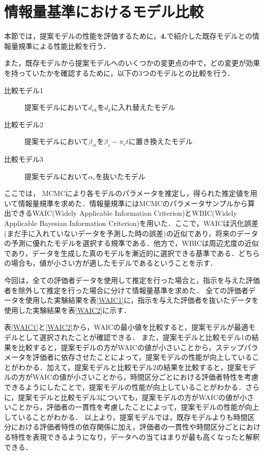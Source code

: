 \documentclass[a4paper,11pt,oneside,openany]{jsbook}
\begin{document}
\section{情報量基準におけるモデル比較}
本節では，提案モデルの性能を評価するために，\textbf{4.}で紹介した既存モデルとの情報量規準による性能比較を行う．

また，既存モデルから提案モデルへのいくつかの変更点の中で，どの変更が効果を持っていたかを確認するために，以下の3つのモデルとの比較を行う．

\begin{description}
\item [比較モデル1]提案モデルにおいて$d_{rk}$を$d_k$に入れ替えたモデル
\item [比較モデル2]提案モデルにおいて$\beta_{rt}$を$\beta_{r} - \pi_{r}t$に置き換えたモデル
\item [比較モデル3]提案モデルにおいて$\alpha_r$を抜いたモデル
\end{description}

ここでは， MCMCにより各モデルのパラメータを推定し，得られた推定値を用いて情報量規準を求めた．情報量規準にはMCMCのパラメータサンプルから算出できるWAIC(Widely Applicable Information Criterion)とWBIC(Widely Applicable Bayesian Information Criterion)を用いた．ここで，WAICは汎化誤差(まだ手に入れていないデータを予測した時の誤差)の近似であり，将来のデータの予測に優れたモデルを選択する規準である．他方で，WBICは周辺尤度の近似であり，データを生成した真のモデルを漸近的に選択できる基準である．どちらの場合も，値が小さい方が適したモデルであるということを示す．

今回は，全ての評価者データを使用して推定を行った場合と，指示を与えた評価者を除外して推定を行った場合に分けて情報量基準を求めた．
全ての評価者データを使用した実験結果を表\ref{WAIC1}に，指示を与えた評価者を抜いたデータを使用した実験結果を表\ref{WAIC2}に示す．

表\ref{WAIC1}と\ref{WAIC2}から，WAICの最小値を比較すると，提案モデルが最適モデルとして選択されたことが確認できる．
また，提案モデルと比較モデル1の結果を比較すると，提案モデルの方がWAICの値が小さいことから，ステップパラメータを評価者に依存させたことによって，提案モデルの性能が向上していることがわかる．加えて，提案モデルと比較モデル2の結果を比較すると，提案モデルの方がWAICの値が小さいことから，時間区分ごとにおける評価者特性を考慮できるようにしたことで，提案モデルの性能が向上していることがわかる．さらに，提案モデルと比較モデル3についても，提案モデルの方がWAICの値が小さいことから，評価者の一貫性を考慮したことによって，提案モデルの性能が向上していることがわかる．
以上より，提案モデルでは，既存モデルよりも時間区分における評価者特性の依存関係に加え，評価者の一貫性や時間区分ごとにおける特性を表現できるようになり，データへの当てはまりが最も高くなったと解釈できる．
\end{document}

